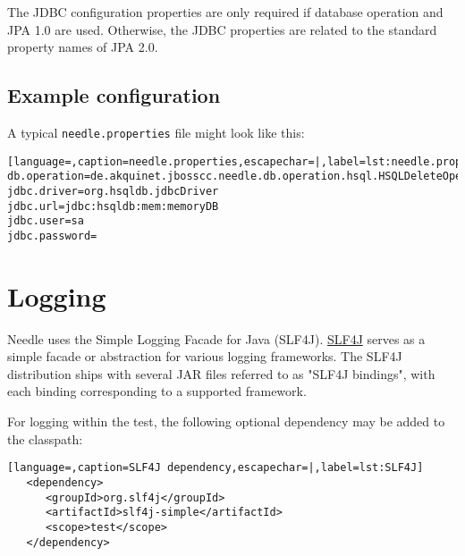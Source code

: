 The JDBC configuration properties are only required if database operation and JPA 1.0 are used.
Otherwise, the JDBC properties are related to the standard property names of JPA 2.0.

\subsection{Example configuration}

A typical \verb|needle.properties| file might look like this:

\begin{lstlisting}[language=,caption=needle.properties,escapechar=|,label=lst:needle.properties]
db.operation=de.akquinet.jbosscc.needle.db.operation.hsql.HSQLDeleteOperation
jdbc.driver=org.hsqldb.jdbcDriver
jdbc.url=jdbc:hsqldb:mem:memoryDB
jdbc.user=sa
jdbc.password=
\end{lstlisting}

\section{Logging}

Needle uses the Simple Logging Facade for Java (SLF4J). \href{http://www.slf4j.org/manual.html}{SLF4J} serves as a simple facade or 
abstraction for various logging frameworks.
The SLF4J distribution ships with several JAR files referred to as "SLF4J bindings", with each binding corresponding to a supported framework.

For logging within the test, the following optional dependency may be added to the classpath:

\begin{lstlisting}[language=,caption=SLF4J dependency,escapechar=|,label=lst:SLF4J]
   <dependency>
      <groupId>org.slf4j</groupId>
      <artifactId>slf4j-simple</artifactId>
      <scope>test</scope>
   </dependency>
\end{lstlisting}

